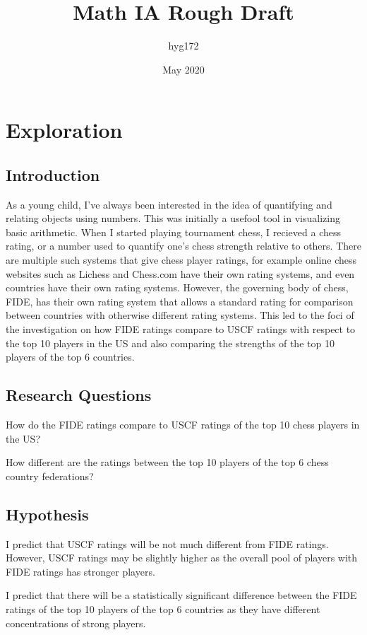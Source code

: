 \documentclass[12pt]{article}
\title{Math IA Rough Draft}
\author{hyg172}
\date{May 2020}
\begin{document}
\maketitle

\tableofcontents
\newpage

\section{Exploration}
\subsection{Introduction}
As a young child, I've always been interested in the idea of quantifying and relating objects using numbers. This was initially a usefool tool in visualizing basic arithmetic. When I started playing tournament chess, I recieved a chess rating, or a number used to quantify one's chess strength relative to others. There are multiple such systems that give chess player ratings, for example online chess websites such as Lichess and Chess.com have their own rating systems, and even countries have their own rating systems. However, the governing body of chess, FIDE, has their own rating system that allows a standard rating for comparison between countries with otherwise different rating systems. This led to the foci of the investigation on how FIDE ratings compare to USCF ratings with respect to the top 10 players in the US and also comparing the strengths of the top 10 players of the top 6 countries.
\subsection{Research Questions}
How do the FIDE ratings compare to USCF ratings of the top 10 chess players in the US?

How different are the ratings between the top 10 players of the top 6 chess country federations?
\subsection{Hypothesis}
I predict that USCF ratings will be not much different from FIDE ratings. However, USCF ratings may be slightly higher as the overall pool of players with FIDE ratings has stronger players.

I predict that there will be a statistically significant difference between the FIDE ratings of the top 10 players of the top 6 countries as they have different concentrations of strong players. 
\end{document}
